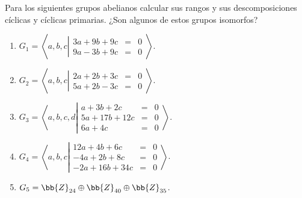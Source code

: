 \begin{ejercicio}\label{ej:7.8}
    Para los siguientes grupos abelianos calcular sus rangos y sus descomposiciones cíclicas y cíclicas primarias. ¿Son algunos de estos grupos isomorfos?
    \begin{enumerate}
        \item $G_1 = \left\langle a, b, c \left|
            \begin{array}{rcl}
                3a + 9b + 9c &=& 0 \\
                9a - 3b + 9c &=& 0
            \end{array}
        \right.\right\rangle$.
        \item $G_2 = \left\langle a, b, c \left|
            \begin{array}{rcl}
                2a + 2b + 3c &=& 0 \\
                5a + 2b - 3c &=& 0
            \end{array}
        \right.\right\rangle$.
        \item $G_3 = \left\langle a, b, c, d \left|
            \begin{array}{rcl}
                a + 3b + 2c &=& 0 \\
                5a + 17b + 12c &=& 0 \\
                6a + 4c &=& 0
            \end{array}
        \right.\right\rangle$.
        \item $G_4 = \left\langle a, b, c \left|
            \begin{array}{rcl}
                12a + 4b + 6c &=& 0 \\
                -4a + 2b + 8c &=& 0 \\
                -2a + 16b + 34c &=& 0
            \end{array}
        \right.\right\rangle$.
        \item $G_5 = \bb{Z}_{24} \oplus \bb{Z}_{40} \oplus \bb{Z}_{35}$.
    \end{enumerate}
\end{ejercicio}


